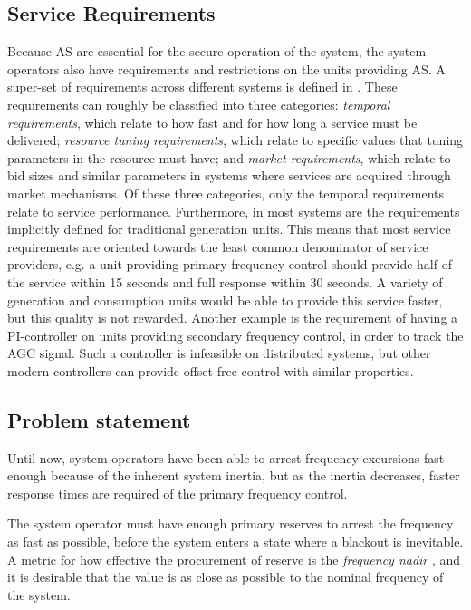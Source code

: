 \subsection*{Service Requirements}
Because AS are essential for the secure operation of the system, the system operators also have requirements and restrictions on the units providing AS. A super-set of requirements across different systems is defined in \cite{Rebours}. These requirements can roughly be classified into three categories: \emph{temporal requirements}, which relate to how fast and for how long a service must be delivered; \emph{resource tuning requirements}, which relate to specific values that tuning parameters in the resource must have; and \emph{market requirements}, which relate to bid sizes and similar parameters in systems where services are acquired through market mechanisms. Of these three categories, only the temporal requirements relate to service performance. Furthermore, in most systems are the requirements implicitly defined for traditional generation units. This means that most service requirements are oriented towards the least common denominator of service providers, e.g. a unit providing primary frequency control should provide half of the service within 15 seconds and full response within 30 seconds\cite{EnerginetAncillary}. A variety of generation and consumption units would be able to provide this service faster, but this quality is not rewarded. Another example is the requirement of having a PI-controller on units providing secondary frequency control, in order to track the AGC signal. Such a controller is infeasible on distributed systems, but other modern controllers can provide offset-free control with similar properties.


\subsection{Problem statement}

 Until now, system operators have been able to arrest frequency excursions fast enough because of the inherent system inertia, but as the inertia decreases, faster response times are required of the primary frequency control.

The system operator must have enough primary reserves to arrest the frequency as fast as possible, before the system enters a state where a blackout is inevitable. A metric for how effective the procurement of reserve is the \emph{frequency nadir} \cite{eto2010use}, and it is desirable that the value is as close as possible to the nominal frequency of the system.

